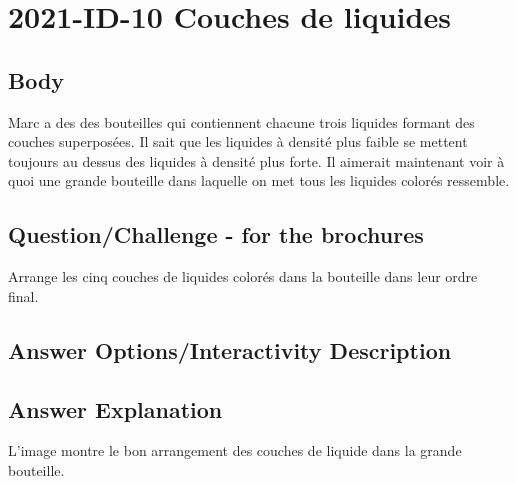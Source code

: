 \documentclass[a4paper,11pt]{report}
\newcommand{\taskGraphicsFolder}{..}
\begin{document}
\section*{\centering{} 2021-ID-10 Couches de liquides}


\subsection*{Body}

Marc a des des bouteilles qui contiennent chacune trois liquides formant des couches superposées. Il sait que les liquides à densité plus faible se mettent toujours au dessus des liquides à densité plus forte. Il aimerait maintenant voir à quoi une grande bouteille dans laquelle on met tous les liquides colorés ressemble.

{\centering%
\par}

{\em


\subsection*{Question/Challenge - for the brochures}

Arrange les cinq couches de liquides colorés dans la bouteille dans leur ordre final.

{\centering%
\par}

}

\begingroup
\renewcommand{\arraystretch}{1.5}
\subsection*{Answer Options/Interactivity Description}



\endgroup

\subsection*{Answer Explanation}

L’image montre le bon arrangement des couches de liquide dans la grande bouteille.

{\centering%
\par}
\end{document}
